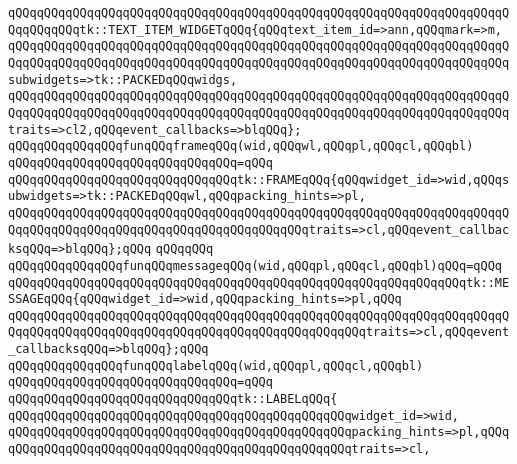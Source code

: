 \verb|qQQqqQQqqQQqqQQqqQQqqQQqqQQqqQQqqQQqqQQqqQQqqQQqqQQqqQQqqQQqqQQqqQQqqQQqqQQqqQQqtk::TEXT_ITEM_WIDGETqQQq{qQQqtext_item_id=>ann,qQQqmark=>m,|\newline
\verb|qQQqqQQqqQQqqQQqqQQqqQQqqQQqqQQqqQQqqQQqqQQqqQQqqQQqqQQqqQQqqQQqqQQqqQQqqQQqqQQqqQQqqQQqqQQqqQQqqQQqqQQqqQQqqQQqqQQqqQQqqQQqqQQqqQQqqQQqqQQqsubwidgets=>tk::PACKEDqQQqwidgs,|\newline
\verb|qQQqqQQqqQQqqQQqqQQqqQQqqQQqqQQqqQQqqQQqqQQqqQQqqQQqqQQqqQQqqQQqqQQqqQQqqQQqqQQqqQQqqQQqqQQqqQQqqQQqqQQqqQQqqQQqqQQqqQQqqQQqqQQqqQQqqQQqqQQqtraits=>cl2,qQQqevent_callbacks=>blqQQq};|\newline
\newline
\verb|qQQqqQQqqQQqqQQqfunqQQqframeqQQq(wid,qQQqwl,qQQqpl,qQQqcl,qQQqbl)|\newline
\verb|qQQqqQQqqQQqqQQqqQQqqQQqqQQqqQQq=qQQq|\newline
\verb|qQQqqQQqqQQqqQQqqQQqqQQqqQQqqQQqtk::FRAMEqQQq{qQQqwidget_id=>wid,qQQqsubwidgets=>tk::PACKEDqQQqwl,qQQqpacking_hints=>pl,|\newline
\verb|qQQqqQQqqQQqqQQqqQQqqQQqqQQqqQQqqQQqqQQqqQQqqQQqqQQqqQQqqQQqqQQqqQQqqQQqqQQqqQQqqQQqqQQqqQQqqQQqqQQqqQQqqQQqqQQqtraits=>cl,qQQqevent_callbacksqQQq=>blqQQq};qQQq|\newline
\verb|qQQqqQQq|\newline
\verb|qQQqqQQqqQQqqQQqfunqQQqmessageqQQq(wid,qQQqpl,qQQqcl,qQQqbl)qQQq=qQQq|\newline
\verb|qQQqqQQqqQQqqQQqqQQqqQQqqQQqqQQqqQQqqQQqqQQqqQQqqQQqqQQqqQQqqQQqtk::MESSAGEqQQq{qQQqwidget_id=>wid,qQQqpacking_hints=>pl,qQQq|\newline
\verb|qQQqqQQqqQQqqQQqqQQqqQQqqQQqqQQqqQQqqQQqqQQqqQQqqQQqqQQqqQQqqQQqqQQqqQQqqQQqqQQqqQQqqQQqqQQqqQQqqQQqqQQqqQQqqQQqqQQqqQQqtraits=>cl,qQQqevent_callbacksqQQq=>blqQQq};qQQq|\newline
\newline
\verb|qQQqqQQqqQQqqQQqfunqQQqlabelqQQq(wid,qQQqpl,qQQqcl,qQQqbl)|\newline
\verb|qQQqqQQqqQQqqQQqqQQqqQQqqQQqqQQq=qQQq|\newline
\verb|qQQqqQQqqQQqqQQqqQQqqQQqqQQqqQQqtk::LABELqQQq{|\newline
\verb|qQQqqQQqqQQqqQQqqQQqqQQqqQQqqQQqqQQqqQQqqQQqqQQqwidget_id=>wid,|\newline
\verb|qQQqqQQqqQQqqQQqqQQqqQQqqQQqqQQqqQQqqQQqqQQqqQQqpacking_hints=>pl,qQQq|\newline
\verb|qQQqqQQqqQQqqQQqqQQqqQQqqQQqqQQqqQQqqQQqqQQqqQQqtraits=>cl,|\newline
